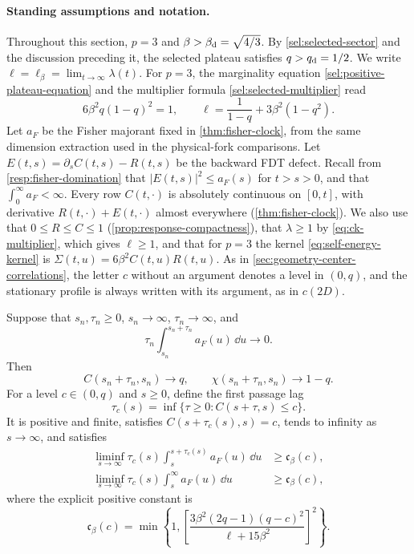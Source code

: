 \paragraph{Standing assumptions and notation.}
Throughout this section, $p=3$ and $\beta>\beta_{\mathrm d}=\sqrt{4/3}$. By \cref{sel:selected-sector} and the discussion preceding it, the selected plateau satisfies $q>q_{\mathrm d}=1/2$. We write $\ell=\ell_\beta=\lim_{t\to\infty}\lambda(t)$. For $p=3$, the marginality equation \eqref{sel:positive-plateau-equation} and the multiplier formula \eqref{sel:selected-multiplier} read
\begin{equation}
 6\beta^2q(1-q)^2=1,
 \qquad \ell=\frac1{1-q}+3\beta^2(1-q^2).
 \label{resp:fisher-calibration}
\end{equation}
Let $a_F$ be the Fisher majorant fixed in \cref{thm:fisher-clock}, from the same dimension extraction used in the physical-fork comparisons. Let $E(t,s)=\partial_sC(t,s)-R(t,s)$ be the backward FDT defect. Recall from \eqref{resp:fisher-domination} that $|E(t,s)|^2\le a_F(s)$ for $t>s>0$, and that $\int_0^\infty a_F<\infty$. Every row $C(t,\cdot)$ is absolutely continuous on $[0,t]$, with derivative $R(t,\cdot)+E(t,\cdot)$ almost everywhere (\cref{thm:fisher-clock}). We also use that $0\le R\le C\le1$ (\cref{prop:response-compactness}), that $\lambda\ge1$ by \eqref{eq:ck-multiplier}, which gives $\ell\ge1$, and that for $p=3$ the kernel \eqref{eq:self-energy-kernel} is $\Sigma(t,u)=6\beta^2C(t,u)R(t,u)$. As in \cref{sec:geometry-center-correlations}, the letter $c$ without an argument denotes a level in $(0,q)$, and the stationary profile is always written with its argument, as in $c(2D)$.

\begin{theorem}
\label{resp:fisher-cost}
Suppose that $s_n,\tau_n\ge0$, $s_n\to\infty$, $\tau_n\to\infty$, and
\begin{equation}
 \tau_n\int_{s_n}^{s_n+\tau_n}a_F(u)\,\dd u\longrightarrow0 .
 \label{resp:fisher-small-window}
\end{equation}
Then
\begin{equation}
 C(s_n+\tau_n,s_n)\to q,
 \qquad \chi(s_n+\tau_n,s_n)\to1-q .
 \label{resp:fisher-window-limit}
\end{equation}
For a level $c\in(0,q)$ and $s\ge0$, define the first passage lag
\[
 \tau_c(s)=\inf\{\tau\ge0:C(s+\tau,s)\le c\}.
\]
It is positive and finite, satisfies $C(s+\tau_c(s),s)=c$, tends to infinity as $s\to\infty$, and satisfies
\begin{align}
 \liminf_{s\to\infty}\tau_c(s)\int_s^{s+\tau_c(s)}a_F(u)\,\dd u
 &\ge\mathfrak c_\beta(c),\label{resp:local-fisher-cost}\\
 \liminf_{s\to\infty}\tau_c(s)\int_s^\infty a_F(u)\,\dd u
 &\ge\mathfrak c_\beta(c),\label{resp:tail-fisher-cost}
\end{align}
where the explicit positive constant is
\begin{equation}
 \mathfrak c_\beta(c)=\min\left\{1,
 \left[\frac{3\beta^2(2q-1)(q-c)^2}{\ell+15\beta^2}\right]^2\right\}.
 \label{resp:fisher-constant}
\end{equation}
\end{theorem}

